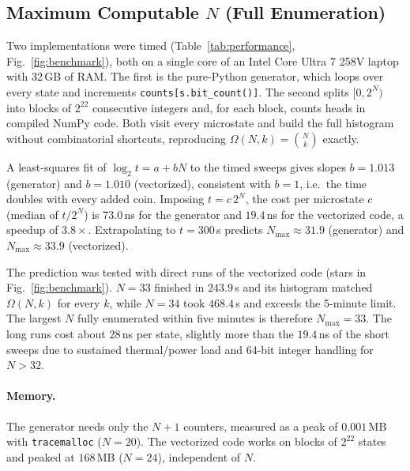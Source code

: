 \documentclass[11pt, a4paper]{article}
\begin{document}
\subsection{Maximum Computable $N$ (Full Enumeration)}
Two implementations were timed (Table~\ref{tab:performance}, Fig.~\ref{fig:benchmark}), both on a single core of an Intel Core Ultra 7 258V laptop with 32\,GB of RAM. The first is the pure-Python generator, which loops over every state and increments \texttt{counts[s.bit\_count()]}. The second splits $[0,2^N)$ into blocks of $2^{22}$ consecutive integers and, for each block, counts heads in compiled NumPy code. Both visit every microstate and build the full histogram without combinatorial shortcuts, reproducing $\Omega(N,k)=\binom{N}{k}$ exactly.

A least-squares fit of $\log_2 t = a + bN$ to the timed sweeps gives slopes $b=1.013$ (generator) and $b=1.010$ (vectorized), consistent with $b=1$, i.e.\ the time doubles with every added coin. Imposing $t=c\,2^N$, the cost per microstate $c$ (median of $t/2^N$) is $73.0$\,ns for the generator and $19.4$\,ns for the vectorized code, a speedup of $3.8\times$. Extrapolating to $t=300$\,s predicts $N_{\max}\approx31.9$ (generator) and $N_{\max}\approx33.9$ (vectorized).

The prediction was tested with direct runs of the vectorized code (stars in Fig.~\ref{fig:benchmark}). $N=33$ finished in $243.9$\,s and its histogram matched $\Omega(N,k)$ for every $k$, while $N=34$ took $468.4$\,s and exceeds the 5-minute limit. The largest $N$ fully enumerated within five minutes is therefore $N_{\max}=33$. The long runs cost about $28$\,ns per state, slightly more than the $19.4$\,ns of the short sweeps due to sustained thermal/power load and 64-bit integer handling for $N>32$.

\paragraph{Memory.} The generator needs only the $N+1$ counters, measured as a peak of $0.001$\,MB with \texttt{tracemalloc} ($N=20$). The vectorized code works on blocks of $2^{22}$ states and peaked at $168$\,MB ($N=24$), independent of $N$.
\end{document}
